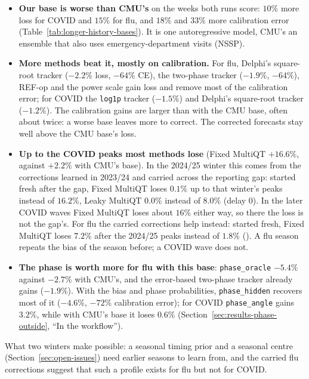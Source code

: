 \documentclass[11pt,a4paper]{article}
\theoremstyle{definition}
\theoremstyle{remark}
\begin{document}
\begin{itemize}[leftmargin=*,itemsep=3pt]
\item \textbf{Our base is worse than CMU's} on the weeks both runs score:
$10\%$ more loss for COVID and $15\%$ for flu, and $18\%$ and $33\%$ more
calibration error (Table~\ref{tab:longer-history-bases}). It is one
autoregressive model, CMU's an ensemble that also uses
emergency-department visits (NSSP).
\item \textbf{More methods beat it, mostly on calibration.} For flu,
Delphi's square-root tracker ($-2.2\%$ loss, $-64\%$ CE), the two-phase
tracker ($-1.9\%$, $-64\%$), REF-op and the power scale gain loss and
remove most of the calibration error; for COVID the \texttt{log1p} tracker
($-1.5\%$) and Delphi's square-root tracker ($-1.2\%$). The
calibration gains are larger than with the CMU base, often about twice:
a worse base leaves more to correct. The corrected forecasts stay well above the CMU
base's loss.
\item \textbf{Up to the COVID peaks most methods lose} (Fixed MultiQT
$+16.6\%$, against $+2.2\%$ with CMU's base). In the 2024/25 winter this
comes from the corrections learned in 2023/24 and carried across the
reporting gap: started fresh after the gap, Fixed MultiQT loses $0.1\%$
up to that winter's peaks instead of $16.2\%$, Leaky MultiQT $0.0\%$
instead of $8.0\%$ (delay 0). In the later COVID waves Fixed MultiQT loses
about $16\%$ either way, so there the loss is not the gap's. For flu the
carried corrections help instead: started fresh, Fixed MultiQT loses
$7.2\%$ after the 2024/25 peaks instead of $1.8\%$
(). A flu season repeats the bias
of the season before; a COVID wave does not.
\item \textbf{The phase is worth more for flu with this base}:
\texttt{phase\_oracle} $-5.4\%$ against $-2.7\%$ with CMU's, and the
error-based two-phase tracker already gains ($-1.9\%$). With the bias and
phase probabilities, \texttt{phase\_hidden} recovers most of it ($-4.6\%$,
$-72\%$ calibration error); for COVID \texttt{phase\_angle} gains $3.2\%$, while
with CMU's base it loses $0.6\%$ (Section~\ref{sec:results-phase-outside},
``In the workflow'').
\end{itemize}
What two winters make possible: a seasonal timing prior and a seasonal
centre (Section~\ref{sec:open-issues}) need earlier seasons to learn
from, and the carried flu corrections suggest that such a profile exists
for flu but not for COVID.
\end{document}
